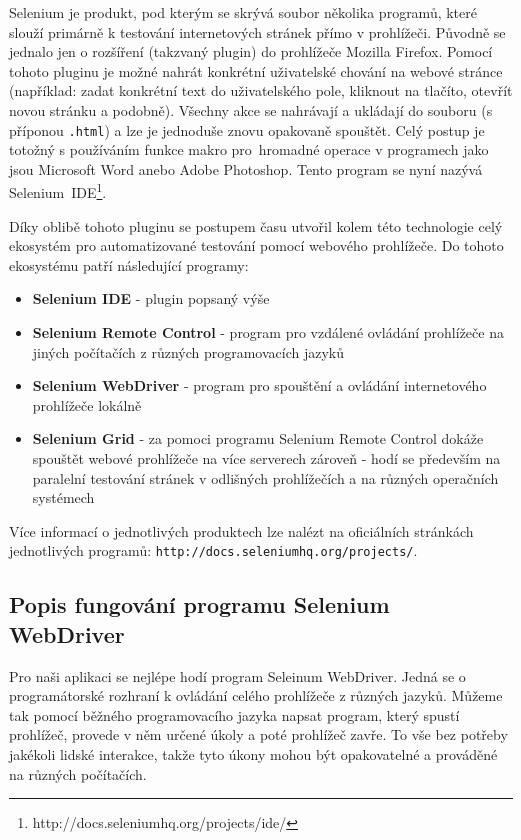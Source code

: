 \documentclass[thesis=M,czech]{FITthesis}[2013/05/10]
\begin{document}
Selenium je produkt, pod kterým se skrývá soubor několika programů, které slouží primárně k testování internetových stránek přímo v prohlížeči. Původně se jednalo jen o rozšíření (takzvaný plugin) do prohlížeče Mozilla Firefox. Pomocí tohoto pluginu je možné nahrát konkrétní uživatelské chování na webové stránce (například: zadat konkrétní text do uživatelského pole, kliknout na tlačíto, otevřít novou stránku a podobně). Všechny akce se nahrávají a ukládají do souboru (s příponou \verb|.html|) a lze je jednoduše znovu opakovaně spouštět. Celý postup je totožný s používáním funkce makro pro~hromadné operace v programech jako jsou Microsoft Word anebo Adobe Photoshop. Tento program se nyní nazývá Selenium~IDE\footnote{http://docs.seleniumhq.org/projects/ide/}.

Díky oblibě tohoto pluginu se postupem času utvořil kolem této technologie celý ekosystém pro automatizované testování pomocí webového prohlížeče. Do tohoto ekosystému patří následující programy:

\begin{itemize}
  \item \textbf{Selenium IDE} - plugin popsaný výše
  \item \textbf{Selenium Remote Control} - program pro vzdálené ovládání prohlížeče na jiných počítačích z různých programovacích jazyků
  \item \textbf{Selenium WebDriver} - program pro spouštění a  ovládání internetového prohlížeče lokálně
  \item \textbf{Selenium Grid} - za pomoci programu Selenium Remote Control dokáže spouštět webové prohlížeče na více serverech zároveň - hodí se především na paralelní testování stránek v odlišných prohlížečích a na různých operačních systémech
\end{itemize}

Více informací o jednotlivých produktech lze nalézt na oficiálních stránkách jednotlivých programů: \verb|http://docs.seleniumhq.org/projects/|. 

\subsection{Popis fungování programu Selenium WebDriver}

Pro naši aplikaci se nejlépe hodí program Seleinum WebDriver. Jedná se o programátorské rozhraní k ovládání celého prohlížeče z různých jazyků. Můžeme tak pomocí běžného programovacího jazyka napsat program, který spustí prohlížeč, provede v něm určené úkoly a poté prohlížeč zavře. To vše bez potřeby jakékoli lidské interakce, takže tyto úkony mohou být opakovatelné a prováděné na různých počítačích.
\end{document}
